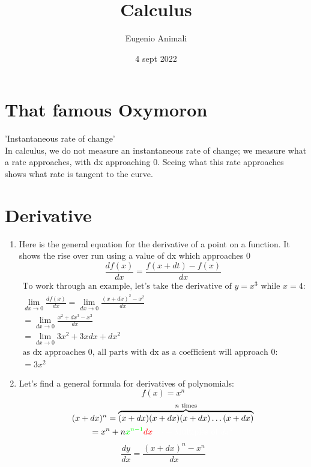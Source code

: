 \documentclass{article}
\title{Calculus}
\author{Eugenio Animali}
\date{4 sept 2022}
\begin{document}
\maketitle
\section*{That famous Oxymoron}
'Instantaneous rate of change'\\
In calculus, we do not measure an instantaneous rate of change; we measure what a rate approaches, with dx approaching 0. Seeing what this rate approaches shows what rate is tangent to the curve.
\section{Derivative}
\begin{enumerate}
    \item
Here is the general equation for the derivative of a point on a function. It shows the rise over run using a value of dx which approaches 0
\[
\frac{df(x)}{dx} = \frac{f(x +dt) - f(x)}{dx}
\]
\begin{gather*}
\label{example 1} \text{To work through an example, let's take the derivative of } y=x^{3}\text{ while }x = 4:\\
    \lim_{dx\to 0} \frac{df(x)}{dx}=\lim_{dx\to 0} \frac{(x+dx)^2-x^2}{dx}\\
    =\lim_{dx\to 0} \frac{x^2+dx^{3}-x^2}{dx}\\
    =\lim_{dx\to 0} 3x^{2}+3xdx+dx^{2}\\
    \text{as dx approaches 0, all parts with dx as a coefficient will approach 0:}\\
    =3x^2
\end{gather*}
    \item Let's find a general formula for derivatives of polynomials:\\
    $$f(x) = x^{n}$$
\begin{gather*}
    (x+dx)^n =\overbrace{(x+dx)(x+dx)(x+dx)\dots (x+dx)}^{n\text{ times}}\\
    =x^n+n\color{green}x^{n-1}\color{red}dx\color{white}\dots+\text{Multiples of }dx^2
\end{gather*}
\[\frac{dy}{dx} = \frac{(x+dx)^{n}-x^n}{dx}\]
\end{enumerate}
\end{document}
